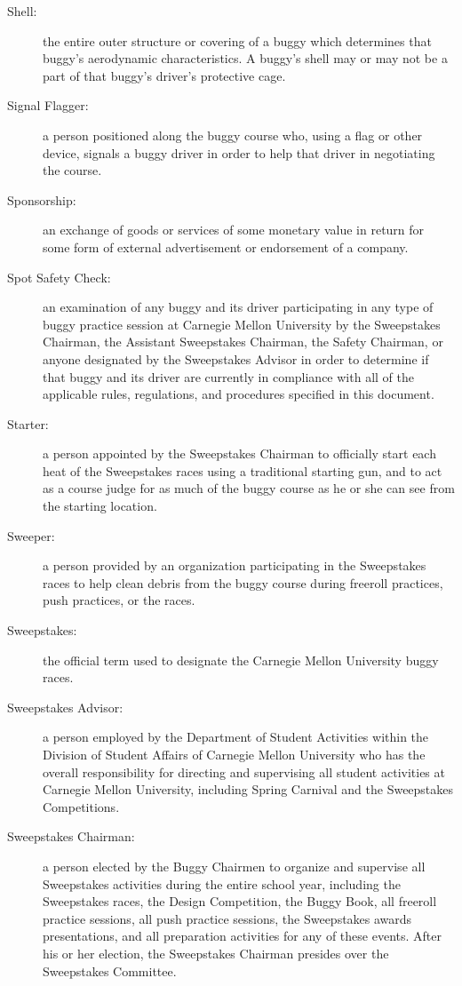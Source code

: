 \begin{description}
	\item[Shell:]
	the entire outer structure or covering of a buggy which determines that buggy's aerodynamic characteristics. A buggy's shell may or may not be a part of that buggy's driver's protective cage.

	\item[Signal Flagger:]
	a person positioned along the buggy course who, using a flag or other device, signals a buggy driver in order to help that driver in negotiating the course.

	\item[Sponsorship:]
	an exchange of goods or services of some monetary value in return for some form of external advertisement or endorsement of a company.

	\item[Spot Safety Check:]
	an examination of any buggy and its driver participating in any type of buggy practice session at Carnegie Mellon University by the Sweepstakes Chairman, the Assistant Sweepstakes Chairman, the Safety Chairman, or anyone designated by the Sweepstakes Advisor in order to determine if that buggy and its driver are currently in compliance with all of the applicable rules, regulations, and procedures specified in this document.

	\item[Starter:]
	a person appointed by the Sweepstakes Chairman to officially start each heat of the Sweepstakes races using a traditional starting gun, and to act as a course judge for as much of the buggy course as he or she can see from the starting location.

	\item[Sweeper:]
	a person provided by an organization participating in the Sweepstakes races to help clean debris from the buggy course during freeroll practices, push practices, or the races.

	\item[Sweepstakes:]
	the official term used to designate the Carnegie Mellon University buggy races.

	\item[Sweepstakes Advisor:]
	a person employed by the Department of Student Activities within the Division of Student Affairs of Carnegie Mellon University who has the overall responsibility for directing and supervising all student activities at Carnegie Mellon University, including Spring Carnival and the Sweepstakes Competitions.

	\item[Sweepstakes Chairman:]
	a person elected by the Buggy Chairmen to organize and supervise all Sweepstakes activities during the entire school year, including the Sweepstakes races, the Design Competition, the Buggy Book, all freeroll practice sessions, all push practice sessions, the Sweepstakes awards presentations, and all preparation activities for any of these events. After his or her election, the Sweepstakes Chairman presides over the Sweepstakes Committee.


\end{description}
